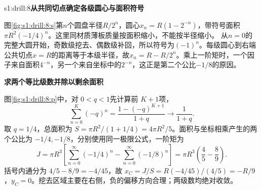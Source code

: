 \begin{drillsolution}{s1:drill:8}\textbf{从共同切点确定各级圆心与面积符号}\par\nobreak
图\ref{fig:s1:drill:8:s}第$n$个圆盘半径$R/2^n$，圆心$x_n=R(1-2^{-n})$，带符号面积$\pi R^2(-1/4)^n$。这里同材质薄板质量按面积缩小，不能按半径缩小。
从$n=0$的完整大圆开始，奇数级挖去、偶数级补回，所以符号为$(-1)^n$。每级圆心到右端公共切点$x=R$的距离等于本级半径，故$x_n=R-R/2^n$。乘上一阶矩时，一个因子来自面积$4^{-n}$，另一个来自坐标中的$2^{-n}$，这正是第二个公比$-1/8$的原因。



\par\medskip{}\noindent\textbf{求两个等比级数并除以剩余面积}\par\nobreak
图\ref{fig:s1:drill:8:p}中，对 $0<q<1$先计算前 $K+1$项，
\[
 \sum_{n=0}^K(-q)^n=\frac{1-(-q)^{K+1}}{1+q}
 \longrightarrow\frac1{1+q}.
\]
取 $q=1/4$，总面积为 $S=\pi R^2/(1+1/4)=4\pi R^2/5$。面积与坐标相乘产生的两个公比为 $-1/4,-1/8$，分别使用同一极限公式，一阶矩为
\[
J=\pi R^3\left[\sum_{n=0}^\infty(-1/4)^n-\sum_{n=0}^\infty(-1/8)^n\right]
=\pi R^3\left(\frac45-\frac89\right).
\]
括号内通分为 $4/5-8/9=-4/45$，故 $x_C=J/S=R(-4/45)/(4/5)=-R/9$，$y_C=0$。挖去区域主要在右侧，负的偏移方向合理；两级数均绝对收敛。\end{drillsolution}
